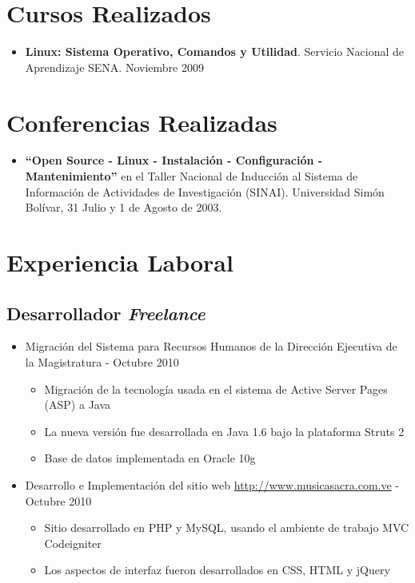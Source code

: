 \documentclass[letterpaper,11pt]{report}
\begin{document}
\section*{Cursos Realizados}
\begin{itemize}
\item \textbf{Linux: Sistema Operativo, Comandos y Utilidad}. Servicio Nacional de Aprendizaje SENA. Noviembre 2009
\end{itemize}

\section*{Conferencias Realizadas}
\begin{itemize}
\item
\textbf{``Open Source - Linux - Instalación - Configuración - Mantenimiento''} en el Taller Nacional de Inducción al Sistema de Información de Actividades de Investigación (SINAI). Universidad Simón Bolívar, 31 Julio y 1 de Agosto de 2003.
\end{itemize}

\newpage
\section*{Experiencia Laboral}

\subsection*{Desarrollador \emph{Freelance}}
\begin{itemize}
\item Migración del Sistema para Recursos Humanos de la Dirección Ejecutiva de la Magistratura - Octubre 2010
	\begin{itemize}
	\item Migración de la tecnología usada en el sistema de Active Server Pages (ASP) a Java
	\item La nueva versión fue desarrollada en Java 1.6 bajo la plataforma Struts 2
	\item Base de datos implementada en Oracle 10g
	\end{itemize}
\item Desarrollo e Implementación del sitio web \url{http://www.musicasacra.com.ve} - Octubre 2010
	\begin{itemize}
		\item Sitio desarrollado en PHP y MySQL, usando el ambiente de trabajo MVC Codeigniter
		\item Los aspectos de interfaz fueron desarrollados en CSS, HTML y jQuery
	\end{itemize}
\end{itemize}
\end{document}

